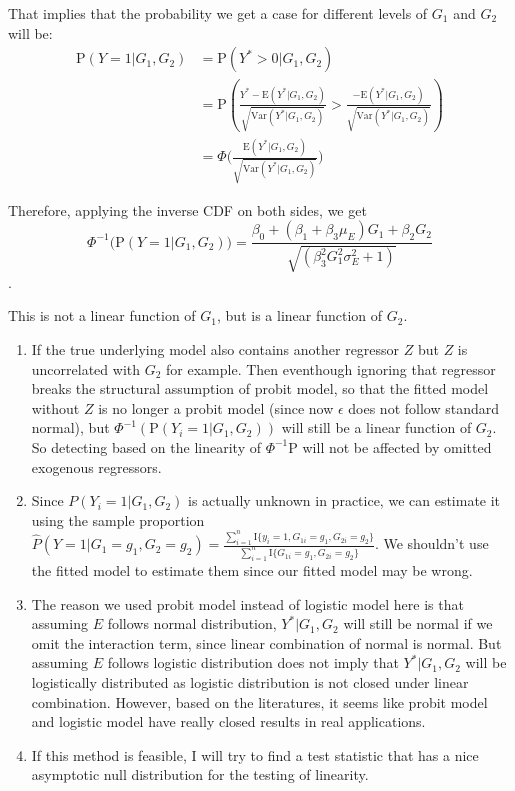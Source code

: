 \documentclass[]{article}
\begin{document}
That implies that the probability we get a case for different levels of
\(G_1\) and \(G_2\) will be:
\begin{equation}\label{eqn:probitModelWithInteraction_Prob} 
\begin{aligned} 
\text{P}(Y = 1 | G_1, G_2) &= \text{P}(Y^* > 0| G_1, G_2) \\ 
                           &= \text{P}(\frac{Y^*  - \text{E}(Y^* |G_1,G_2)}{\sqrt{\text{Var}(Y^* |G_1,G_2)}} > \frac{-\text{E}(Y^* |G_1,G_2)}{\sqrt{\text{Var}(Y^* |G_1,G_2)}}) \\
                           &= \Phi \bigg( \frac{\text{E}(Y^* |G_1,G_2)}{\sqrt{\text{Var}(Y^* |G_1,G_2)}} \bigg)
\end{aligned}
\end{equation}

Therefore, applying the inverse CDF on both sides, we get
\[\Phi^{-1} \bigg(\text{P}(Y = 1 | G_1, G_2) \bigg) = \frac{\beta_0+(\beta_1 + \beta_3 \mu_E)G_1 + \beta_2 G_2}{\sqrt{(\beta_3^2 G_1^2 \sigma_E^2 + 1)}} \].

This is not a linear function of \(G_1\), but is a linear function of
\(G_2\).

\begin{enumerate}
\item If the true underlying model also contains another regressor $Z$ but $Z$ is uncorrelated with $G_2$ for example. Then eventhough ignoring that regressor breaks the structural assumption of probit model, so that the fitted model without $Z$ is no longer a probit model (since now $\epsilon$ does not follow standard normal), but $\Phi^{-1}(\text{P}(Y_i = 1|G_1,G_2))$ will still be a linear function of $G_2$. So detecting based on the linearity of $\Phi^{-1}\text{P}$ will not be affected by omitted exogenous regressors.
\item Since $P(Y_i = 1|G_1,G_2)$ is actually unknown in practice, we can estimate it using the sample proportion $\hat{P}(Y = 1|G_1 = g_1,G_2 = g_2) = \frac{\sum_{i=1}^{n} \text{I}\{y_i =1,G_{1i} = g_1, G_{2i} = g_2\}}{\sum_{i=1}^{n}  \text{I}\{G_{1i} = g_1, G_{2i} = g_2\}}$. We shouldn't use the fitted model to estimate them since our fitted model may be wrong.
\item The reason we used probit model instead of logistic model here is that assuming $E$ follows normal distribution, $Y^*|G_1,G_2$ will still be normal if we omit the interaction term, since linear combination of normal is normal. But assuming $E$ follows logistic distribution does not imply that $Y^*|G_1,G_2$ will be logistically distributed as logistic distribution is not closed under linear combination. However, based on the literatures, it seems like probit model and logistic model have really closed results in real applications.
\item If this method is feasible, I will try to find a test statistic that has a nice asymptotic null distribution for the testing of linearity.
\end{enumerate}
\end{document}
